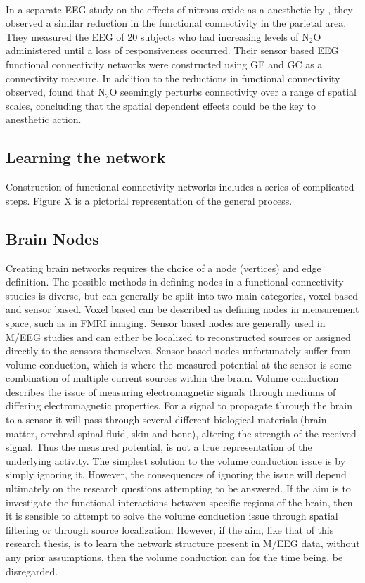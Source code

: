 \documentclass[11pt]{article}
\begin{document}
\\
In a separate EEG study on the effects of nitrous oxide as a anesthetic by \citet{kuhl}, they observed a similar reduction in the functional connectivity in the parietal area. They measured the EEG of 20 subjects who had increasing levels of N$_2$O administered until a loss of responsiveness occurred. Their sensor based EEG functional connectivity networks were constructed using GE and GC as a connectivity measure. In addition to the reductions in functional connectivity observed, \citet{kuhl} found that  N$_2$O seemingly perturbs connectivity over a range of spatial scales, concluding that the spatial dependent effects could be the key to anesthetic action. 

\subsection{Learning the network}
Construction of functional connectivity networks includes a series of complicated steps. Figure X is a pictorial representation of the general process.  


\subsection{Brain Nodes}
Creating brain networks requires the choice of a node (vertices) and edge definition. The possible methods in defining nodes in a functional connectivity studies is diverse, but can generally be split into two main categories, voxel based and sensor based. Voxel based can be described as defining nodes in measurement space, such as in FMRI imaging. Sensor based nodes are generally used in M/EEG studies and can either be localized to reconstructed sources or assigned directly to the sensors themselves. Sensor based nodes unfortunately suffer from volume conduction, which is where the measured potential at the sensor is some combination of multiple current sources within the brain. Volume conduction describes the issue of measuring electromagnetic signals through mediums of differing electromagnetic properties. For a signal to propagate through the brain to a sensor it will pass through several different biological materials (brain matter, cerebral spinal fluid, skin and bone), altering the strength of the received signal. Thus the measured potential, is not a true representation of the underlying activity. The simplest solution to the volume conduction issue is by simply ignoring it. However, the consequences of ignoring the issue will depend ultimately on the research questions attempting to be answered. If the aim is to investigate the functional interactions between specific regions of the brain, then it is sensible to attempt to solve the volume conduction issue through spatial filtering or through source localization. However, if the aim, like that of this research thesis, is to learn the network structure present in M/EEG data, without any prior assumptions, then the volume conduction can for the time being, be disregarded.
 
\end{document}

